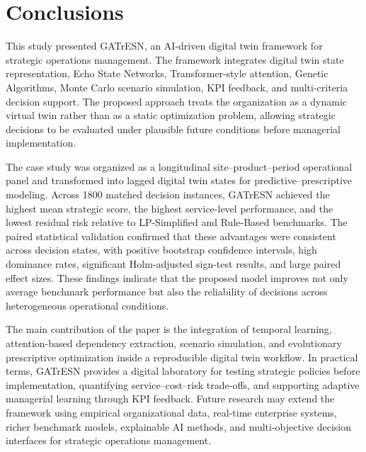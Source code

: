 \documentclass[apajournal,article,submit,pdftex,moreauthors]{Definitions/mdpi}
\begin{document}
\section{Conclusions}
This study presented GATrESN, an AI-driven digital twin framework for strategic operations management. The framework integrates digital twin state representation, Echo State Networks, Transformer-style attention, Genetic Algorithms, Monte Carlo scenario simulation, KPI feedback, and multi-criteria decision support. The proposed approach treats the organization as a dynamic virtual twin rather than as a static optimization problem, allowing strategic decisions to be evaluated under plausible future conditions before managerial implementation.

The case study was organized as a longitudinal site--product--period operational panel and transformed into lagged digital twin states for predictive--prescriptive modeling. Across 1800 matched decision instances, GATrESN achieved the highest mean strategic score, the highest service-level performance, and the lowest residual risk relative to LP-Simplified and Rule-Based benchmarks. The paired statistical validation confirmed that these advantages were consistent across decision states, with positive bootstrap confidence intervals, high dominance rates, significant Holm-adjusted sign-test results, and large paired effect sizes. These findings indicate that the proposed model improves not only average benchmark performance but also the reliability of decisions across heterogeneous operational conditions.

The main contribution of the paper is the integration of temporal learning, attention-based dependency extraction, scenario simulation, and evolutionary prescriptive optimization inside a reproducible digital twin workflow. In practical terms, GATrESN provides a digital laboratory for testing strategic policies before implementation, quantifying service--cost--risk trade-offs, and supporting adaptive managerial learning through KPI feedback. Future research may extend the framework using empirical organizational data, real-time enterprise systems, richer benchmark models, explainable AI methods, and multi-objective decision interfaces for strategic operations management.

\end{document}
